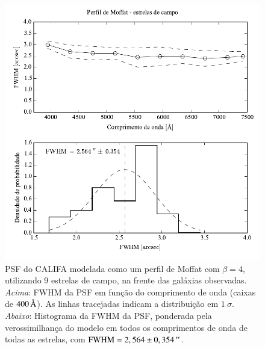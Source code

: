 \begin{figure}
	\includegraphics{figuras/PSFMoffatBeta4_field}
	\caption[PSF do CALIFA -- estrelas de campo.]
	{PSF do CALIFA modelada como um perfil de Moffat com $\beta=4$, utilizando 9
	estrelas de campo, na frente das galáxias observadas. {\em Acima}: FWHM da PSF
	em função do comprimento de onda (caixas de $400\,\text{\normalfont\AA}$). As linhas
	tracejadas indicam a distribuição em $1\ \sigma$. {\em Abaixo}: Histograma da
	FWHM da PSF, ponderada pela verossimilhança do modelo em todos os comprimentos
	de onda de todas as estrelas, com $\mathrm{FWHM}=2,564 \pm 0,354\,^{\prime\prime}$.}
	\label{fig:PSFField}
\end{figure}

